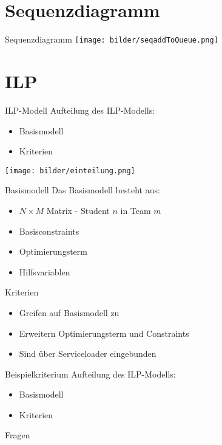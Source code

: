\documentclass[18pt]{beamer}
\begin{document}
\section{Sequenzdiagramm} %
\begin{frame}{Sequenzdiagramm}
\texttt{[image: bilder/seqaddToQueue.png]}
\end{frame}

\section{ILP}
\begin{frame}{ILP-Modell}
Aufteilung des ILP-Modells:
\begin{itemize}
  \item Basismodell
  \item Kriterien
\end{itemize}
\texttt{[image: bilder/einteilung.png]}
\end{frame}

\begin{frame}{Basismodell}
Das Basismodell besteht aus:
\begin{itemize}
  \item $N \times M$ Matrix - Student $n$ in Team $m$
  \item Basisconstraints 
  \item Optimierungsterm
  \item Hilfsvariablen
\end{itemize}
\end{frame}

\begin{frame}{Kriterien}
\begin{itemize}
  \item Greifen auf Basismodell zu
  \item Erweitern Optimierungsterm und Constraints
  \item Sind über Serviceloader eingebunden
\end{itemize}
\end{frame}

\begin{frame}{Beispielkriterium} %
Aufteilung des ILP-Modells:
\begin{itemize}
  \item Basismodell
  \item Kriterien
\end{itemize}

\end{frame}

\appendix
\beginbackup

\begin{frame}{Fragen}
\printbibliography
\end{frame}

\backupend
\end{document}

